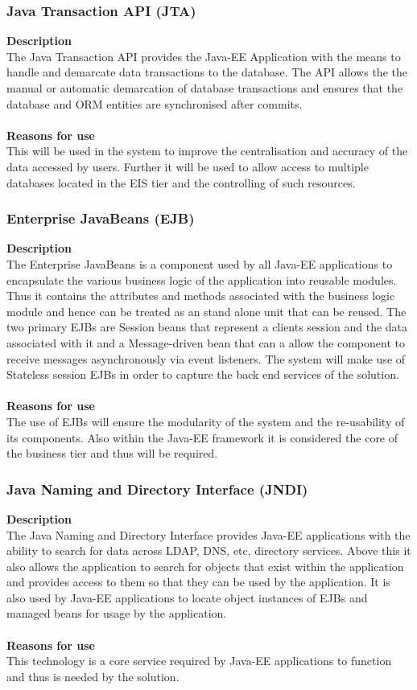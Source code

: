 \documentclass[12pt]{article}
\begin{document}
\subsubsection{Java Transaction API (JTA)}
\textbf{Description}\\
The Java Transaction API provides the Java-EE Application with the means to handle and demarcate data transactions to the database. The API allows the the manual or automatic demarcation of database transactions and ensures that the database and ORM entities are synchronised after commits.\\\\ 
\textbf{Reasons for use}\\
This will be used in the system to improve the centralisation and accuracy of the data accessed by users. Further it will be used to allow access to multiple databases located in the EIS tier and the controlling of such resources.

\subsubsection{Enterprise JavaBeans (EJB)}
\textbf{Description}\\
The Enterprise JavaBeans is a component used by all Java-EE applications to encapsulate the various business logic of the application into reusable modules. Thus it contains the attributes and methods associated with the business logic module and hence can be treated as an stand alone unit that can be reused. The two primary EJBs are Session beans that represent a clients session and the data associated with it and a Message-driven bean that can a allow the component to receive messages asynchronously via event listeners. The system will make use of Stateless session EJBs in order to capture the back end services of the solution.\\\\
\textbf{Reasons for use}\\
The use of EJBs will ensure the modularity of the system and the re-usability of its components. Also within the Java-EE framework it is considered the core of the business tier and thus will be required.
  

\subsubsection{Java Naming and Directory Interface (JNDI)}
\textbf{Description}\\
The Java Naming and Directory Interface provides Java-EE applications with the ability to search for data across LDAP, DNS, etc, directory services. Above this it also allows the application to search for objects that exist within the application and provides access to them so that they can be used by the application. It is also used by Java-EE applications to locate object instances of EJBs and managed beans for usage by the application.\\\\
\textbf{Reasons for use}\\
This technology is a core service required by Java-EE applications to function and thus is needed by the solution.
\end{document}
